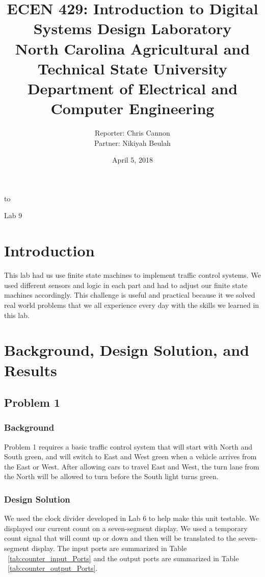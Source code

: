 to\documentclass[11pt]{article}
\title {{\titleFont ECEN 429: Introduction to Digital Systems Design Laboratory \\ North Carolina Agricultural and Technical State University \\ Department of Electrical and Computer Engineering}} %
\author{\titleFont Reporter: Chris Cannon \\ \titleFont Partner: Nikiyah Beulah} %
\date{\titleFont April 5, 2018}
\begin{document}
\begin{titlingpage}
\maketitle
\begin{center}
	Lab 9
\end{center}
\end{titlingpage}

\section{Introduction}
This lab had us use finite state machines to implement traffic control systems. We used different sensors and logic in each part and had to adjust our finite state machines accordingly. This challenge is useful and practical because it we solved real world problems that we all experience every day with the skills we learned in this lab.

\section{Background, Design Solution, and Results}

\subsection{Problem 1 }

\subsubsection{Background}
Problem 1 requires a basic traffic control system that will start with North and South green, and will switch to East and West green when a vehicle arrives from the East or West. After allowing cars to travel East and West, the turn lane from the North will be allowed to turn before the South light turns green.

\subsubsection{Design Solution}
We used the clock divider developed in Lab 6 to help make this unit testable. We displayed our current count on a seven-segment display. We used a temporary count signal that will count up or down and then will be translated to the seven-segment display. The input ports are summarized in Table ~\ref{tab:counter_input_Ports} and the output ports are summarized in Table ~\ref{tab:counter_output_Ports}.
\end{document}
